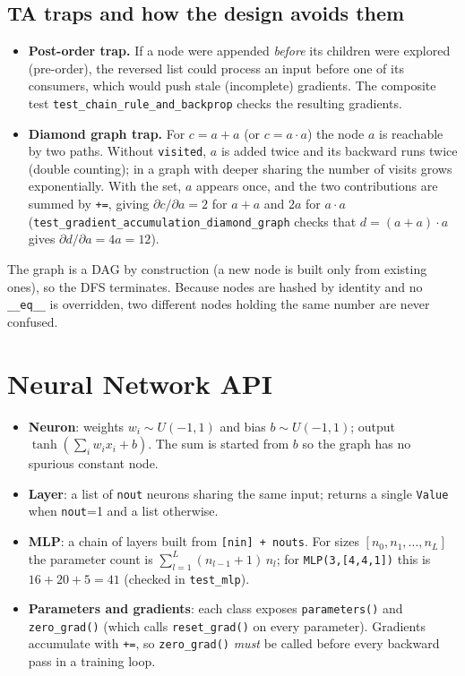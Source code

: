 \documentclass[11pt,a4paper]{article}
\begin{document}
\subsection{TA traps and how the design avoids them}
\begin{itemize}
\item \textbf{Post-order trap.} If a node were appended \emph{before} its children were explored (pre-order), the reversed list could process an input before one of its consumers, which would push stale (incomplete) gradients. The composite test \texttt{test\_chain\_rule\_and\_backprop} checks the resulting gradients.
\item \textbf{Diamond graph trap.} For $c=a+a$ (or $c=a\cdot a$) the node $a$ is reachable by two paths. Without \texttt{visited}, $a$ is added twice and its backward runs twice (double counting); in a graph with deeper sharing the number of visits grows exponentially. With the set, $a$ appears once, and the two contributions are summed by \texttt{+=}, giving $\partial c/\partial a=2$ for $a+a$ and $2a$ for $a\cdot a$ (\texttt{test\_gradient\_accumulation\_diamond\_graph} checks that $d=(a+a)\cdot a$ gives $\partial d/\partial a=4a=12$).
\end{itemize}
The graph is a DAG by construction (a new node is built only from existing ones), so the DFS terminates. Because nodes are hashed by identity and no \texttt{\_\_eq\_\_} is overridden, two different nodes holding the same number are never confused.

\section{Neural Network API}
\begin{itemize}
\item \textbf{Neuron}: weights $w_i\sim U(-1,1)$ and bias $b\sim U(-1,1)$; output $\tanh(\sum_i w_ix_i+b)$. The sum is started from $b$ so the graph has no spurious constant node.
\item \textbf{Layer}: a list of \texttt{nout} neurons sharing the same input; returns a single \texttt{Value} when \texttt{nout}=1 and a list otherwise.
\item \textbf{MLP}: a chain of layers built from \texttt{[nin] + nouts}. For sizes $[n_0,n_1,\dots,n_L]$ the parameter count is $\sum_{l=1}^{L}(n_{l-1}+1)\,n_l$; for \texttt{MLP(3,[4,4,1])} this is $16+20+5=41$ (checked in \texttt{test\_mlp}).
\item \textbf{Parameters and gradients}: each class exposes \texttt{parameters()} and \texttt{zero\_grad()} (which calls \texttt{reset\_grad()} on every parameter). Gradients accumulate with \texttt{+=}, so \texttt{zero\_grad()} \emph{must} be called before every backward pass in a training loop.
\end{itemize}
\end{document}
